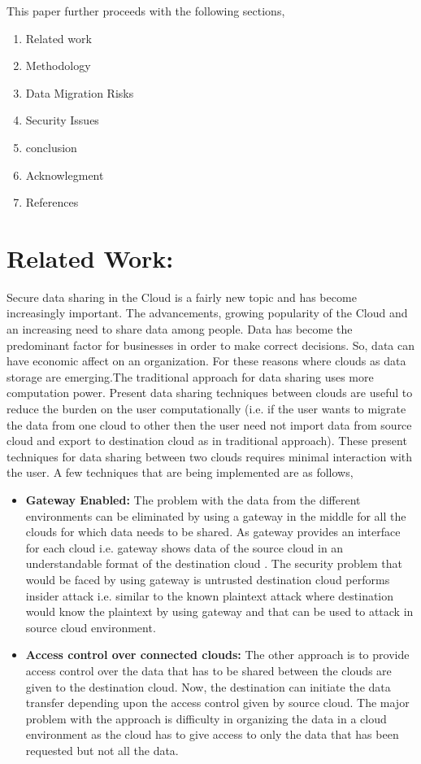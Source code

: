 \documentclass[11pt, pdftex, conference]{IEEEtran}
\begin{document}
This paper further proceeds with the following sections,
\begin{enumerate}
\item Related work
\item Methodology
\item Data Migration Risks
\item Security Issues
\item conclusion
\item Acknowlegment
\item References
\end{enumerate}

\section{\textbf{Related Work:}}
\hspace{10mm}Secure data sharing in the Cloud is a fairly new topic and has become increasingly important. The advancements, growing popularity of the Cloud and an increasing need to share data among people. Data has become the predominant factor for businesses in order to make correct decisions. So, data can have economic affect on an organization. For these reasons where clouds as data storage are emerging\cite{12}.The traditional approach for data sharing uses more computation power. Present data sharing techniques between clouds are useful to reduce the burden on the user computationally (i.e. if the user wants to migrate the data from one cloud to other then the user need not import data from source cloud and export to destination cloud as in traditional approach). These present techniques for data sharing between two clouds requires minimal interaction with the user. A few techniques that are being implemented are as follows,
\begin{itemize}
\item{\textbf{Gateway Enabled:}}
The problem with the data from the different environments can be eliminated by using a gateway in the middle for all the clouds for which data needs to be shared. As gateway provides an interface for each cloud i.e. gateway shows data of the source cloud in an understandable format of the destination cloud \cite{1}. The security problem that would be faced by using gateway is untrusted destination cloud performs insider attack i.e. similar to the known plaintext attack where destination would know the plaintext by using gateway and that can be used to attack in source cloud environment.
\end{itemize}
\begin{itemize}
\item{\textbf{Access control over connected clouds:}}
The other approach is to provide access control over the data that has to be shared between the clouds are given to the destination cloud\cite{2}. Now, the destination can initiate the data transfer depending upon the access control given by source cloud. The major problem with the approach is difficulty in organizing the data in a cloud environment as the cloud has to give access to only the data that has been requested but not all the data.
\end{itemize}
\end{document}

